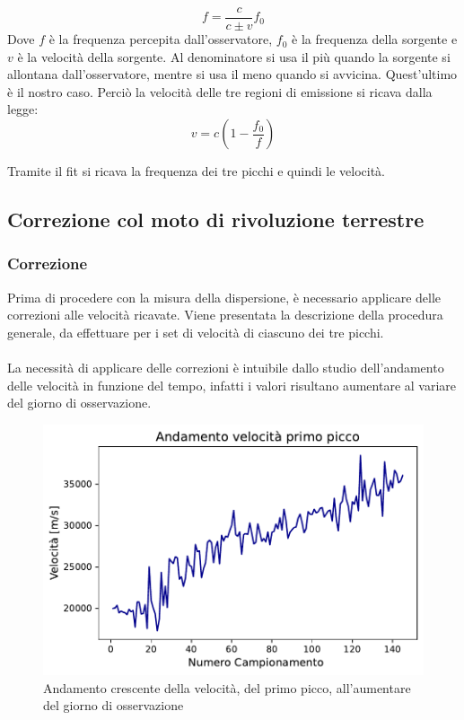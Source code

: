 \begin{equation}
    f=\frac{c}{c\pm v}f_{0}
\end{equation}
Dove $f$ è la frequenza percepita dall'osservatore, $f_{0}$ è la frequenza della sorgente e $v$ è la velocità della sorgente. Al denominatore si usa il più quando la sorgente si allontana dall'osservatore, mentre si usa il meno quando si avvicina. Quest'ultimo è il nostro caso. Perciò la velocità delle tre regioni di emissione si ricava dalla legge:
\begin{equation}
    v=c (1-\frac{f_{0}}{f})
\end{equation}

Tramite il fit si ricava la frequenza dei tre picchi e quindi le velocità.


\subsection{Correzione col moto di rivoluzione terrestre}

\subsubsection{Correzione}

Prima di procedere con la misura della dispersione, è necessario applicare delle correzioni alle velocità ricavate. Viene presentata la descrizione della procedura generale, da effettuare per i set di velocità di ciascuno dei tre picchi.
\\\\
La necessità di applicare delle correzioni è intuibile dallo studio dell'andamento delle velocità in funzione del tempo, infatti i valori risultano aumentare al variare del giorno di osservazione. 

\begin{figure}[H]
	\centering
	\includegraphics[scale=0.8]{Prima_NO.pdf}
	\caption{Andamento crescente della velocità, del primo picco, all'aumentare del giorno di osservazione}
    	\label{fig:Prima_NO}
\end{figure}


